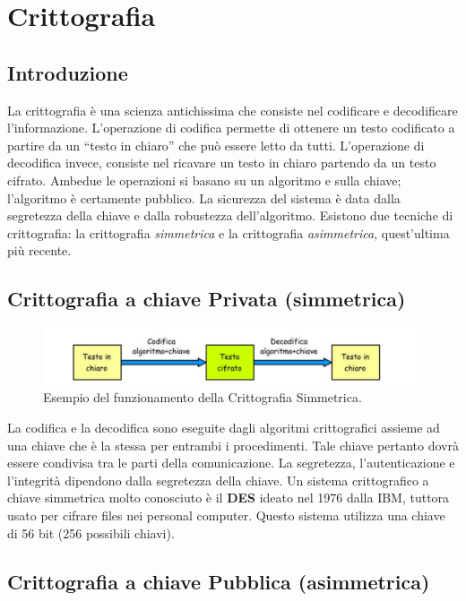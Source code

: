 \chapter{Crittografia}

\section{Introduzione}

La crittografia è una scienza antichissima che consiste nel codificare e
decodificare l'informazione.
L'operazione di codifica permette di ottenere un testo codificato a partire da
un “testo in chiaro” che
può essere letto da tutti.
L'operazione di decodifica invece, consiste nel ricavare un testo in chiaro
partendo da un
testo cifrato. Ambedue le operazioni si basano su un algoritmo e sulla chiave;
l'algoritmo è
certamente pubblico. La sicurezza del sistema è data dalla segretezza della
chiave e dalla
robustezza dell'algoritmo. Esistono due tecniche di crittografia:
la crittografia \textit{simmetrica} e la
crittografia \textit{asimmetrica}, quest'ultima più recente.

\section{Crittografia a chiave Privata (simmetrica)}

\begin{figure}[H]
    \centering
    \includegraphics[width=\textwidth, keepaspectratio]{capitoli/crittografia/imgs/privata.png}
    \caption{Esempio del funzionamento della Crittografia Simmetrica.}
\end{figure}

La codifica e la decodifica sono eseguite dagli algoritmi crittografici assieme
ad una chiave che è la
stessa per entrambi i procedimenti. Tale chiave pertanto dovrà essere condivisa
tra le parti della
comunicazione. La segretezza, l'autenticazione e l'integrità dipendono dalla
segretezza della chiave.
Un sistema crittografico a chiave simmetrica molto conosciuto è il
\textbf{DES} ideato nel 1976 dalla IBM,
tuttora usato per cifrare files nei personal computer.
Questo sistema utilizza una chiave di 56 bit
(256 possibili chiavi).

\section{Crittografia a chiave Pubblica (asimmetrica)}

